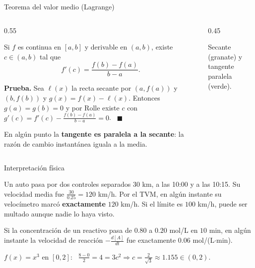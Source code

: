 \documentclass[10pt,aspectratio=169]{beamer}
\begin{document}
\begin{frame}{Teorema del valor medio (Lagrange)}
  \begin{columns}
    \begin{column}{0.55\textwidth}
      \begin{teorema}[TVM]
        Si $f$ es continua en $[a,b]$ y derivable en $(a,b)$, existe $c\in(a,b)$ tal que
        \[ f'(c)=\frac{f(b)-f(a)}{b-a}. \]
      \end{teorema}
      \textbf{Prueba.} Sea $\ell(x)$ la recta secante por $(a,f(a))$ y $(b,f(b))$ y $g(x)=f(x)-\ell(x)$. Entonces $g(a)=g(b)=0$ y por Rolle
      existe $c$ con $g'(c)=f'(c)-\frac{f(b)-f(a)}{b-a}=0$. \ $\blacksquare$
      \begin{idea}
        En algún punto la \textbf{tangente es paralela a la secante}: la razón de cambio instantánea iguala a la media.
      \end{idea}
    \end{column}
    \begin{column}{0.45\textwidth}
      \centering

      \small Secante (granate) y tangente paralela (verde).
    \end{column}
  \end{columns}
\end{frame}

\begin{frame}{Interpretación física}
  \begin{ejemplo}
    Un auto pasa por dos controles separados $30$ km, a las 10:00 y a las 10:15. Su velocidad media fue
    $\frac{30}{0.25}=120$ km/h. Por el TVM, en algún instante su velocímetro marcó \textbf{exactamente} $120$ km/h.
    Si el límite es $100$ km/h, puede ser multado aunque nadie lo haya visto.
  \end{ejemplo}
  \begin{ejemplo}[5: química]
    Si la concentración de un reactivo pasa de $0.80$ a $0.20$ mol/L en $10$ min, en algún instante la velocidad de reacción
    $-\frac{d[A]}{dt}$ fue exactamente $0.06$ mol/(L$\cdot$min).
  \end{ejemplo}
  \begin{ejemplo}[6: hallar $c$]
    $f(x)=x^3$ en $[0,2]$: \ $\frac{8-0}{2}=4=3c^2\Rightarrow c=\frac{2}{\sqrt3}\approx1.155\in(0,2)$.
  \end{ejemplo}
\end{frame}
\end{document}
